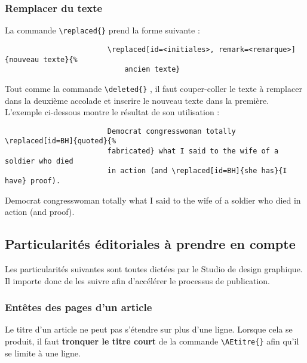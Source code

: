 \documentclass[french]{article}
\newcommand{\cmd}[1]{%
	\texttt{\textbackslash#1\{\}}
}
\begin{document}
			\subsubsection{Remplacer du texte}
			
				La commande \cmd{replaced} prend la forme suivante :
				
				\begin{shaded*}
					\begin{verbatim}
						\replaced[id=<initiales>, remark=<remarque>]{nouveau texte}{%
						    ancien texte}
					\end{verbatim}
				\end{shaded*}
			
				Tout comme la commande \cmd{deleted}, il faut couper-coller le texte à remplacer
				dans la deuxième accolade et inscrire le nouveau texte dans la première. L'exemple
				ci-dessous montre le résultat de son utilisation :
				
				\begin{shaded*}
					\begin{verbatim}
						Democrat congresswoman totally \replaced[id=BH]{quoted}{%
						fabricated} what I said to the wife of a soldier who died
						in action (and \replaced[id=BH]{she has}{I have} proof).
					\end{verbatim}
				\end{shaded*}
			
				\begin{leftbar}
					Democrat congresswoman totally  what I said to the wife of a soldier who died
					in action (and  proof).
				\end{leftbar}
			
		\subsection{Particularités éditoriales à prendre en compte}
		
			Les particularités suivantes sont toutes dictées par le Studio de design graphique.
			Il importe donc de les suivre afin d'accélérer le processus de publication.
		
			\subsubsection{Entêtes des pages d'un article}
			
			Le titre d'un article ne peut pas s'étendre sur plus d'une ligne. Lorsque cela se produit,
			il faut \textbf{tronquer le titre court} de la commande \cmd{AEtitre} afin qu'il se limite
			à une ligne.
			
\end{document}
